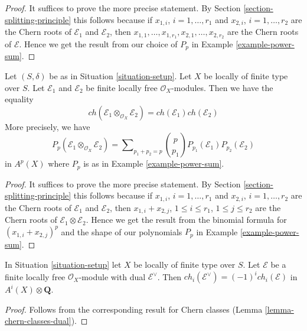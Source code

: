 \begin{proof}
It suffices to prove the more precise statement. By
Section \ref{section-splitting-principle}
this follows because if $x_{1, i}$, $i = 1, \ldots, r_1$
and $x_{2, i}$, $i = 1, \ldots, r_2$ are the
Chern roots of $\mathcal{E}_1$ and $\mathcal{E}_2$, then
$x_{1, 1}, \ldots, x_{1, r_1}, x_{2, 1}, \ldots, x_{2, r_2}$
are the Chern roots of $\mathcal{E}$. Hence we get the result
from our choice of $P_p$ in Example \ref{example-power-sum}.
\end{proof}

\begin{lemma}
\label{lemma-chern-character-multiplicative}
Let $(S, \delta)$ be as in Situation \ref{situation-setup}. Let $X$ be locally
of finite type over $S$. Let $\mathcal{E}_1$ and $\mathcal{E}_2$
be finite locally free $\mathcal{O}_X$-modules.
Then we have the equality
$$
ch(\mathcal{E}_1 \otimes_{\mathcal{O}_X} \mathcal{E}_2) =
ch(\mathcal{E}_1) ch(\mathcal{E}_2)
$$
More precisely, we have
$$
P_p(\mathcal{E}_1 \otimes_{\mathcal{O}_X} \mathcal{E}_2) =
\sum\nolimits_{p_1 + p_2 = p}
{p \choose p_1} P_{p_1}(\mathcal{E}_1) P_{p_2}(\mathcal{E}_2)
$$
in $A^p(X)$ where $P_p$ is as in Example \ref{example-power-sum}.
\end{lemma}

\begin{proof}
It suffices to prove the more precise statement. By
Section \ref{section-splitting-principle}
this follows because if $x_{1, i}$, $i = 1, \ldots, r_1$
and $x_{2, i}$, $i = 1, \ldots, r_2$ are the
Chern roots of $\mathcal{E}_1$ and $\mathcal{E}_2$, then
$x_{1, i} + x_{2, j}$, $1 \leq i \leq r_1$, $1 \leq j \leq r_2$
are the Chern roots of $\mathcal{E}_1 \otimes \mathcal{E}_2$.
Hence we get the result from the binomial formula for
$(x_{1, i} + x_{2, j})^p$ and the
shape of our polynomials $P_p$ in Example \ref{example-power-sum}.
\end{proof}

\begin{lemma}
\label{lemma-chern-character-dual}
In Situation \ref{situation-setup} let $X$ be locally of finite type over $S$.
Let $\mathcal{E}$ be a finite locally free $\mathcal{O}_X$-module
with dual $\mathcal{E}^\vee$. Then
$ch_i(\mathcal{E}^\vee) = (-1)^i ch_i(\mathcal{E})$ in
$A^i(X) \otimes \mathbf{Q}$.
\end{lemma}

\begin{proof}
Follows from the corresponding result for Chern classes
(Lemma \ref{lemma-chern-classes-dual}).
\end{proof}











